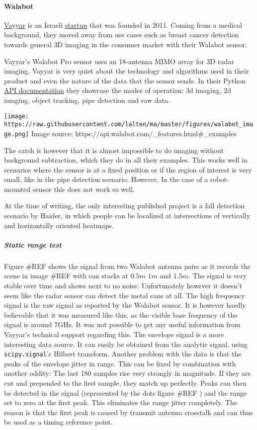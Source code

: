 \paragraph{Walabot}\label{walabot}

\href{https://www.vayyar.com/}{Vayyar} is an Israeli
\href{https://www.crunchbase.com/organization/vayyar}{startup} that was
founded in 2011. Coming from a medical background, they moved away from
use cases such as breast cancer detection towards general 3D imaging in
the consumer market with their Walabot sensor.

Vayyar's Walabot Pro sensor uses an 18-antenna MIMO array for 3D radar
imaging. Vayyar is very quiet about the technology and algorithms used
in their product and even the nature of the data that the sensor sends.
In their Python \href{https://api.walabot.com}{API documentation} they
showcase the modes of operation: 3d imaging, 2d imaging, object
tracking, pipe detection and raw data.

\texttt{[image: https://raw.githubusercontent.com/lalten/ma/master/figures/walabot\_image.png]}
Image source: https://api.walabot.com/\_features.html\#\_examples

The catch is however that it is almost impossible to do imaging without
background subtraction, which they do in all their examples. This works
well in scenarios where the sensor is at a fixed position or if the
region of interest is very small, like in the pipe detection scenario.
However, In the case of a robot-mounted sensor this does not work so
well.

At the time of writing, the only interesting published project is a fall
detection scenario \cite{Haider2017} by Haider, in which people can be
localized at intersections of vertically and horizontally oriented
heatmaps.

\subparagraph{Static range test}\label{static-range-test}

Figure \#REF shows the signal from two Walabot antenna pairs as it
records the scene in image \#REF with can stacks at \(0.5m\) \(1m\) and
\(1.5m\). The signal is very stable over time and shows next to no
noise. Unfortunately however it doesn't seem like the radar sensor can
detect the metal cans at all. The high frequency signal is the raw
signal as reported by the Walabot sensor. It is however hardly
believable that it was measured like this, as the visible base frequency
of the signal is around 7GHz. It was not possible to get any useful
information from Vayyar's technical support regarding this. The envelope
signal is a more interesting data source. It can easily be obtained from
the analytic signal, using \texttt{scipy.signal}'s Hilbert transform.
Another problem with the data is that the peaks of the envelope jitter
in range. This can be fixed by combination with another oddity: The last
180 samples rise very strongly in magnitude. If they are cut and
prepended to the first sample, they match up perfectly. Peaks can then
be detected in the signal (represented by the dots figure \#REF ) and
the range set to zero at the first peak. This eliminates the range
jitter completely. The reason is that the first peak is caused by
transmit antenna crosstalk and can thus be used as a timing reference
point.

